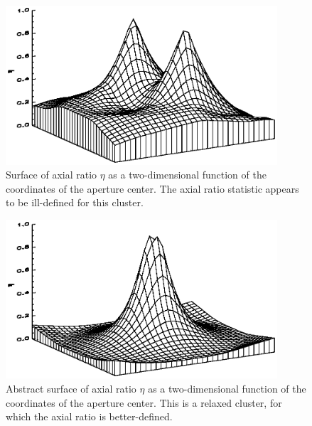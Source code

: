 \documentclass{aastex} \usepackage{natbib}
\begin{document}
\begin{figure}[b]
  \centering
  \includegraphics[width=0.9\textwidth,trim=0mm 10mm 0mm 10mm]{f4.eps}
  \caption{Surface of axial ratio $\eta$ as a two-dimensional function
    of the coordinates of the aperture center.  The axial ratio
    statistic appears to be ill-defined for this cluster.}
  \label{fig:badaxialratiosurface}
\end{figure}

\begin{figure}[b]
  \centering
  \includegraphics[width=0.9\textwidth,trim=0mm 10mm 0mm 10mm]{f5.eps}
  \caption{Abstract surface of axial ratio $\eta$ as a two-dimensional
    function of the coordinates of the aperture center.  This is a
    relaxed cluster, for which the axial ratio is better-defined.}
  \label{fig:goodaxialratiosurface}
\end{figure}
\end{document}

